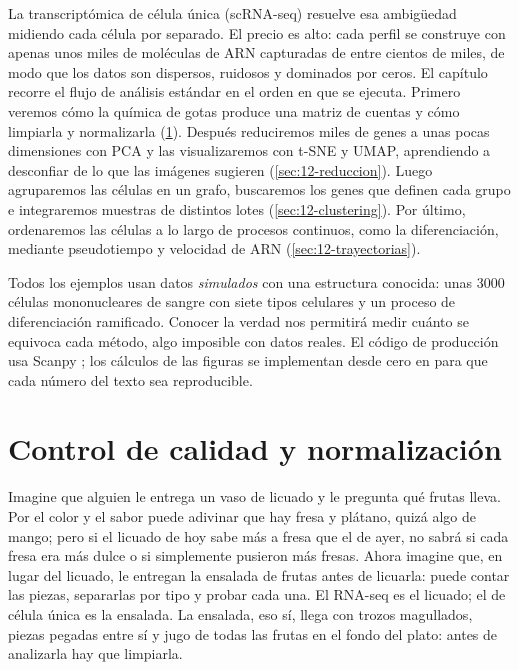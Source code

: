La transcriptómica de célula única (scRNA-seq) resuelve esa ambigüedad midiendo cada célula por separado. El precio es alto: cada perfil se construye con apenas unos miles de moléculas de ARN capturadas de entre cientos de miles, de modo que los datos son dispersos, ruidosos y dominados por ceros. El capítulo recorre el flujo de análisis estándar en el orden en que se ejecuta. Primero veremos cómo la química de gotas produce una matriz de cuentas y cómo limpiarla y normalizarla (\cref{sec:12-qc}). Después reduciremos miles de genes a unas pocas dimensiones con PCA y las visualizaremos con t-SNE y UMAP, aprendiendo a desconfiar de lo que las imágenes sugieren (\cref{sec:12-reduccion}). Luego agruparemos las células en un grafo, buscaremos los genes que definen cada grupo e integraremos muestras de distintos lotes (\cref{sec:12-clustering}). Por último, ordenaremos las células a lo largo de procesos continuos, como la diferenciación, mediante pseudotiempo y velocidad de ARN (\cref{sec:12-trayectorias}).

Todos los ejemplos usan datos \emph{simulados} con una estructura conocida: unas \num{3000} células mononucleares de sangre con siete tipos celulares y un proceso de diferenciación ramificado. Conocer la verdad nos permitirá medir cuánto se equivoca cada método, algo imposible con datos reales. El código de producción usa Scanpy \parencite{c12-wolf2018}; los cálculos de las figuras se implementan desde cero en  para que cada número del texto sea reproducible.

\section{Control de calidad y normalización}\label{sec:12-qc}

\begin{intuicion}
Imagine que alguien le entrega un vaso de licuado y le pregunta qué frutas lleva. Por el color y el sabor puede adivinar que hay fresa y plátano, quizá algo de mango; pero si el licuado de hoy sabe más a fresa que el de ayer, no sabrá si cada fresa era más dulce o si simplemente pusieron más fresas. Ahora imagine que, en lugar del licuado, le entregan la ensalada de frutas antes de licuarla: puede contar las piezas, separarlas por tipo y probar cada una. El RNA-seq  es el licuado; el de célula única es la ensalada. La ensalada, eso sí, llega con trozos magullados, piezas pegadas entre sí y jugo de todas las frutas en el fondo del plato: antes de analizarla hay que limpiarla.
\end{intuicion}

